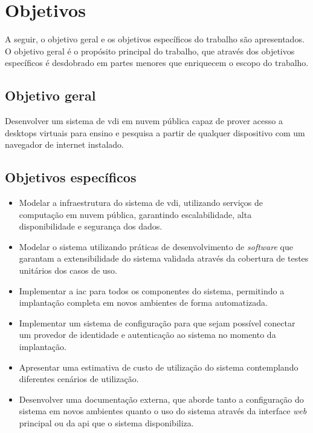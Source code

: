 
\section{Objetivos}
\label{sec:objetivos}

A seguir, o objetivo geral e os objetivos específicos do trabalho são apresentados. O objetivo geral
é o propósito principal do trabalho, que através dos objetivos específicos é desdobrado em partes
menores que enriquecem o escopo do trabalho.

\subsection{Objetivo geral}
\label{subsec:objetivoGeral}

Desenvolver um sistema de \gls{vdi} em nuvem pública capaz de prover acesso a \glspl{desktop}
virtuais para ensino e pesquisa a partir de qualquer dispositivo com um navegador de internet
instalado.

\subsection{Objetivos específicos}
\label{subsec:objetivosEspecificos}

\begin{itemize}
    \item Modelar a infraestrutura do sistema de \gls{vdi}, utilizando serviços de computação em nuvem pública, garantindo escalabilidade, alta disponibilidade e segurança dos dados.

    \item Modelar o sistema utilizando práticas de desenvolvimento de \textit{software} que garantam a extensibilidade do sistema validada através da cobertura de testes unitários dos casos de uso.

    \item Implementar a \gls{iac} para todos os componentes do sistema, permitindo a implantação completa em novos ambientes de forma automatizada.

    \item Implementar um sistema de configuração para que sejam possível conectar um provedor de identidade e autenticação ao sistema no momento da implantação.

    \item Apresentar uma estimativa de custo de utilização do sistema contemplando diferentes cenários de utilização.

    \item Desenvolver uma documentação externa, que aborde tanto a configuração do sistema em novos ambientes quanto o uso do sistema através da interface \textit{web} principal ou da \gls{api} que o sistema disponibiliza.
\end{itemize}

